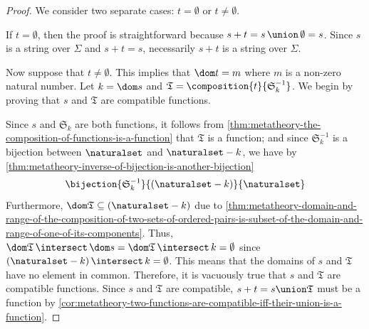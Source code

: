 \begin{proof}
    We consider two separate cases: \( t = \emptyset \) or \( t \neq \emptyset \).

    \vspace{0.3cm}
    \noindent
    If \( t = \emptyset \), then the proof is straightforward because \( s + t = s \,{\union}\, \emptyset = s \).
    Since \( s \) is a string over \( \Sigma \) and \( s + t = s \), necessarily \( s + t \) is a string over \( \Sigma \).

    \vspace{0.3cm}
    \noindent
    Now suppose that \( t \neq \emptyset \).
    This implies that \( \dom t = m \) where \( m \) is a non-zero natural number.
    Let \( k = \dom s \) and \( \mathfrak{T} = \composition{t}{\mathfrak{S}^{-1}_{k}} \).
    We begin by proving that \( s \) and \( \mathfrak{T} \) are compatible functions.

    \vspace{0.3cm}
    \noindent
    Since \( s \) and \( \mathfrak{S}_{k} \) are both functions, it follows from \cref{thm:metatheory-the-composition-of-functions-is-a-function}
    that \( \mathfrak{T} \) is a function; and since \( \mathfrak{S}^{-1}_{k} \) is a bijection between
    \( \naturalset \) and \( \naturalset - k \), we have by \cref{thm:metatheory-inverse-of-bijection-is-another-bijection}
    \begin{equation*}
        \bijection{\mathfrak{S}^{-1}_{k}}{\mleft( \naturalset - k \mright)}{\naturalset}
    \end{equation*}
    Furthermore, \( \dom \mathfrak{T} \subseteq \mleft( \naturalset - k \mright) \)
    due to \cref{thm:metatheory-domain-and-range-of-the-composition-of-two-sets-of-ordered-pairs-is-subset-of-the-domain-and-range-of-one-of-its-components}.
    Thus, \( \dom \mathfrak{T} \,{\intersect}\, \dom s = \dom \mathfrak{T} \,{\intersect}\, k = \emptyset \) since
    \( \mleft( \naturalset - k \mright) \,{\intersect}\, k = \emptyset \).
    This means that the domains of \( s \) and \( \mathfrak{T} \) have no element in common.
    Therefore, it is vacuously true that \( s \) and \( \mathfrak{T} \) are compatible functions.
    Since \( s \) and \( \mathfrak{T} \) are compatible, \( s + t = s \union \mathfrak{T} \) must be a function by
    \cref{cor:metatheory-two-functions-are-compatible-iff-their-union-is-a-function}.


\end{proof}
